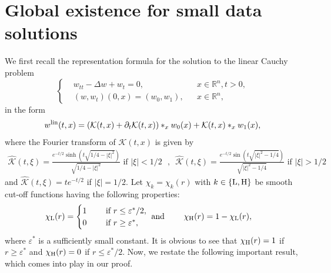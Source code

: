 \documentclass[11pt,reqno]{amsart}
\begin{document}
	\section{Global existence for small data solutions}\label{sec2}
	We first recall the representation formula for the solution to the linear Cauchy problem 
	\begin{equation}\label{Linear_damped_wave}
		\left\{
		\begin{aligned}
			&w_{tt}-\Delta w+w_t=0,&&x\in \mathbb{R}^n,t>0,\\
			&(w,w_t)(0,x)=(w_0,w_1),&&x\in \mathbb{R}^n,
		\end{aligned}
		\right.
	\end{equation}
	in the form
	\begin{equation*}
		w^{\rm lin}(t,x) = (\mathcal{K}(t,x) +\partial_t \mathcal{K}(t,x))\ast_x w_0(x) + \mathcal{K}(t,x) \ast_x w_1(x),
	\end{equation*}
	where the Fourier transform of $\mathcal{K}(t,x)$ is given by
	\begin{align*}
		\widehat{\mathcal{K}}(t,\xi) = 
		\displaystyle\frac{e^{-t/2}\sinh{\left(t \sqrt{1/4 -|\xi|^2}\right)}}{\sqrt{1/4- |\xi|^2}}  \text{ if } |\xi| < 1/2
		\,\,\text{ , }\,\, \widehat{\mathcal{K}}(t, \xi) = \displaystyle\frac{e^{-t/2}\sin{\left(t \sqrt{|\xi|^2-1/4}\right)}}{\sqrt{|\xi|^2-1/4}} \text{ if } |\xi| > 1/2
	\end{align*}
	and $\widehat{\mathcal{K}}(t,\xi) = t e^{-t/2}$ if $|\xi| = 1/2$. Let $\chi_k= \chi_k(r)$ with $k\in\{\rm L,H\}$ be smooth cut-off functions having the following properties:
	\begin{align*}
		&\chi_{\rm L}(r)=
		\begin{cases}
			1 &\quad \text{ if }r\le \varepsilon^*/2, \\
			0 &\quad \text{ if }r\ge \varepsilon^*,
		\end{cases}
		\text{ and } \qquad
		\chi_{\rm H}(r)= 1 -\chi_{\rm L}(r),
	\end{align*}
	where $\varepsilon^*$ is a sufficiently small constant. It is obvious to see that $\chi_{\rm H}(r)= 1$ if $r \geq \varepsilon^*$ and $\chi_{\rm H}(r)= 0$ if $r \le \varepsilon^*/2$. Now, we restate the following important result, which comes into play in our proof.
	
\end{document}
